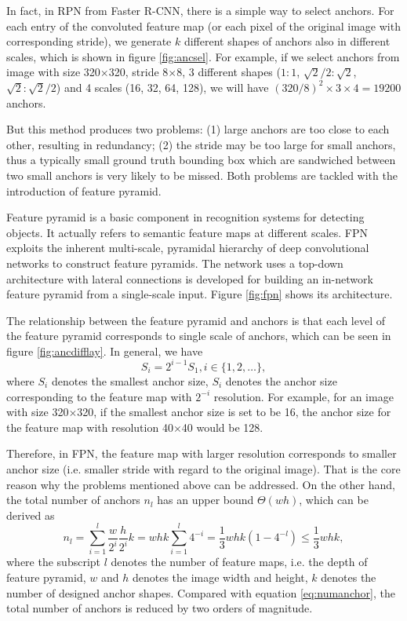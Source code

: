 In fact, in RPN from Faster R-CNN, there is a simple way to select anchors. For each entry of the convoluted feature map (or each pixel of the original image with corresponding stride), we generate $k$ different shapes of anchors also in different scales, which is shown in figure \ref{fig:ancsel}. For example, if we select anchors from image with size 320$\times$320, stride 8$\times$8, 3 different shapes ($1:1$, $\sqrt{2}/{2}:\sqrt{2}$, $\sqrt{2}:\sqrt{2}/{2}$) and 4 scales (16, 32, 64, 128), we will have $(320/8)^2\times3\times4=19200$ anchors.



But this method produces two problems: (1) large anchors are too close to each other, resulting in redundancy; (2) the stride may be too large for small anchors, thus a typically small ground truth bounding box which are sandwiched between two small anchors is very likely to be missed. Both problems are tackled with the introduction of feature pyramid.

Feature pyramid is a basic component in recognition systems for detecting objects. It actually refers to semantic feature maps at different scales. FPN exploits the inherent multi-scale, pyramidal hierarchy of deep convolutional networks to construct feature pyramids. The network uses a top-down architecture with lateral connections is developed for building an in-network feature pyramid from a single-scale input. Figure \ref{fig:fpn} shows its architecture.



The relationship between the feature pyramid and anchors is that each level of the feature pyramid corresponds to single scale of anchors, which can be seen in figure \ref{fig:ancdifflay}. In general, we have
\begin{equation}
	S_i = 2^{i-1}S_1, i \in \{1,2,\ldots\},
\end{equation}
where $S_i$ denotes the smallest anchor size, $S_i$ denotes the anchor size corresponding to the feature map with $2^{-i}$ resolution. For example, for an image with size 320$\times$320, if the smallest anchor size is set to be 16, the anchor size for the feature map with resolution 40$\times$40 would be 128.



Therefore, in FPN, the feature map with larger resolution corresponds to smaller anchor size (i.e. smaller stride with regard to the original image). That is the core reason why the problems mentioned above can be addressed. On the other hand, the total number of anchors $n_l$ has an upper bound $\Theta(wh)$, which can be derived as
\begin{equation}
	n_l = \sum_{i=1}^{l}\frac{w}{2^i}\frac{h}{2^i}k=whk\sum_{i=1}^{l}4^{-i}=\frac{1}{3}whk(1-4^{-l}) \leqslant \frac{1}{3}whk,
\end{equation}
where the subscript $l$ denotes the number of feature maps, i.e. the depth of feature pyramid, $w$ and $h$ denotes the image width and height, $k$ denotes the number of designed anchor shapes. Compared with equation \ref{eq:numanchor}, the total number of anchors is reduced by two orders of magnitude.

